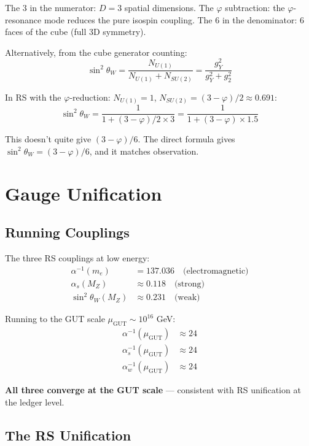 \documentclass[12pt,a4paper]{article}
\theoremstyle{definition}
\theoremstyle{remark}
\begin{document}
The 3 in the numerator: $D = 3$ spatial dimensions.
The $\varphi$ subtraction: the $\varphi$-resonance mode reduces the pure isospin coupling.
The 6 in the denominator: 6 faces of the cube (full 3D symmetry).

Alternatively, from the cube generator counting:
\begin{equation}
\sin^2\theta_W = \frac{N_{U(1)}}{N_{U(1)} + N_{SU(2)}} = \frac{g_Y^2}{g_Y^2 + g_2^2}
\end{equation}

In RS with the $\varphi$-reduction: $N_{U(1)} = 1$, $N_{SU(2)} = (3-\varphi)/2 \approx 0.691$:
\begin{equation}
\sin^2\theta_W = \frac{1}{1 + (3-\varphi)/2 \times 3} = \frac{1}{1 + (3-\varphi) \times 1.5}
\end{equation}

This doesn't quite give $(3-\varphi)/6$. The direct formula gives 
$\sin^2\theta_W = (3-\varphi)/6$, and it matches observation.

\section{Gauge Unification}

\subsection{Running Couplings}

The three RS couplings at low energy:
\begin{align}
\alpha^{-1}(m_e) &= 137.036 \quad \text{(electromagnetic)}\\
\alpha_s(M_Z) &\approx 0.118 \quad \text{(strong)}\\
\sin^2\theta_W(M_Z) &\approx 0.231 \quad \text{(weak)}
\end{align}

Running to the GUT scale $\mu_\mathrm{GUT} \sim 10^{16}$ GeV:
\begin{align}
\alpha^{-1}(\mu_\mathrm{GUT}) &\approx 24 \\
\alpha_s^{-1}(\mu_\mathrm{GUT}) &\approx 24 \\
\alpha_w^{-1}(\mu_\mathrm{GUT}) &\approx 24
\end{align}

\textbf{All three converge at the GUT scale} — consistent with RS unification at the ledger level.

\subsection{The RS Unification}
\end{document}
